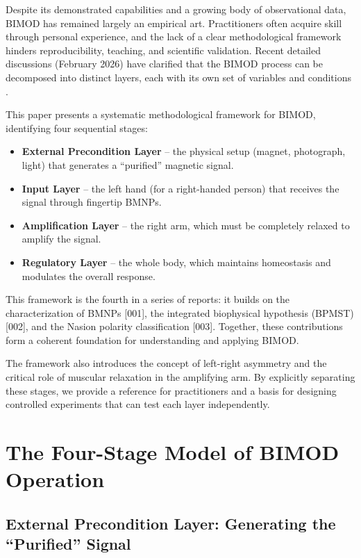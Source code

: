 \documentclass[12pt,a4paper]{article}
\begin{document}
Despite its demonstrated capabilities and a growing body of observational data, BIMOD has remained largely an empirical art. Practitioners often acquire skill through personal experience, and the lack of a clear methodological framework hinders reproducibility, teaching, and scientific validation. Recent detailed discussions (February 2026) have clarified that the BIMOD process can be decomposed into distinct layers, each with its own set of variables and conditions \citep{yoon2026discussion}.

This paper presents a systematic methodological framework for BIMOD, identifying four sequential stages:
\begin{itemize}
    \item \textbf{External Precondition Layer} – the physical setup (magnet, photograph, light) that generates a ``purified'' magnetic signal.
    \item \textbf{Input Layer} – the left hand (for a right-handed person) that receives the signal through fingertip BMNPs.
    \item \textbf{Amplification Layer} – the right arm, which must be completely relaxed to amplify the signal.
    \item \textbf{Regulatory Layer} – the whole body, which maintains homeostasis and modulates the overall response.
\end{itemize}

This framework is the fourth in a series of reports: it builds on the characterization of BMNPs [001], the integrated biophysical hypothesis (BPMST) [002], and the Nasion polarity classification [003]. Together, these contributions form a coherent foundation for understanding and applying BIMOD.

The framework also introduces the concept of left-right asymmetry and the critical role of muscular relaxation in the amplifying arm. By explicitly separating these stages, we provide a reference for practitioners and a basis for designing controlled experiments that can test each layer independently.

\section{The Four-Stage Model of BIMOD Operation}

\subsection{External Precondition Layer: Generating the ``Purified'' Signal}
\end{document}

